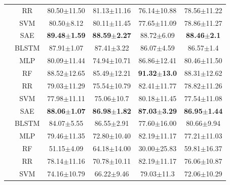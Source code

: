 \begin{table}[h]
\begin{tabular}{|c|c|c|c|c|c|}
    & RR & \multicolumn{1}{c}{80.50$\pm$11.50} & \multicolumn{1}{c}{81.13$\pm$11.16} & \multicolumn{1}{c}{76.14$\pm$10.88} & 78.56$\pm$11.22\\
    & SVM & \multicolumn{1}{c}{80.50$\pm$8.12} & \multicolumn{1}{c}{80.11$\pm$11.45} & \multicolumn{1}{c}{77.65$\pm$11.09} & 78.86$\pm$11.27\\
    \Xhline{1pt}
    \multirow{6}{*}{75\%} %
    & SAE & \multicolumn{1}{c}{{\bfseries 89.48$\pm$1.59}} & \multicolumn{1}{c}{{\bfseries 88.59$\pm$2.27}} & \multicolumn{1}{c}{88.72$\pm$6.09} & {\bfseries 88.46$\pm$2.1}\\
    & BLSTM & \multicolumn{1}{c}{87.91$\pm$1.07} & \multicolumn{1}{c}{87.41$\pm$3.22} & \multicolumn{1}{c}{86.07$\pm$4.59} & 86.57$\pm$1.4\\
    & MLP & \multicolumn{1}{c}{80.09$\pm$11.44} & \multicolumn{1}{c}{74.94$\pm$10.71} & \multicolumn{1}{c}{86.86$\pm$12.41} & 80.46$\pm$11.50\\
    & RF & \multicolumn{1}{c}{88.52$\pm$12.65} & \multicolumn{1}{c}{85.49$\pm$12.21} & \multicolumn{1}{c}{{\bfseries 91.32$\pm$13.0}} & 88.31$\pm$12.62\\
    & RR & \multicolumn{1}{c}{79.03$\pm$11.29} & \multicolumn{1}{c}{75.54$\pm$10.79} & \multicolumn{1}{c}{82.41$\pm$11.77} & 78.82$\pm$11.26\\
    & SVM & \multicolumn{1}{c}{77.98$\pm$11.11} & \multicolumn{1}{c}{75.06$\pm$10.7} & \multicolumn{1}{c}{80.18$\pm$11.45} & 77.54$\pm$11.08\\
    \Xhline{1pt}
    \multirow{6}{*}{80\%} %
    & SAE & \multicolumn{1}{c}{{\bfseries 88.06$\pm$1.07}} & \multicolumn{1}{c}{{\bfseries 86.98$\pm$1.82}} & \multicolumn{1}{c}{{\bfseries 87.03$\pm$3.29}} & {\bfseries 86.95$\pm$1.44}\\
    & BLSTM & \multicolumn{1}{c}{84.07$\pm$5.55} & \multicolumn{1}{c}{86.55$\pm$2.91} & \multicolumn{1}{c}{77.60$\pm$16.00} & 80.66$\pm$9.94\\
    & MLP & \multicolumn{1}{c}{79.46$\pm$11.35} & \multicolumn{1}{c}{72.80$\pm$10.40} & \multicolumn{1}{c}{82.19$\pm$11.17} & 77.21$\pm$11.03\\
    & RF & \multicolumn{1}{c}{51.15$\pm$4.09} & \multicolumn{1}{c}{64.18$\pm$14.00} & \multicolumn{1}{c}{30.00$\pm$25.83} & 59.81$\pm$16.37\\
    & RR & \multicolumn{1}{c}{78.14$\pm$11.16} & \multicolumn{1}{c}{70.78$\pm$10.11} & \multicolumn{1}{c}{82.19$\pm$11.17} & 76.06$\pm$10.87\\
    & SVM & \multicolumn{1}{c}{74.16$\pm$10.79} & \multicolumn{1}{c}{66.22$\pm$9.46} & \multicolumn{1}{c}{79.03$\pm$11.3} & 72.06$\pm$10.29\\
    \cline{1-6}
    \end{tabular}
\end{table}

